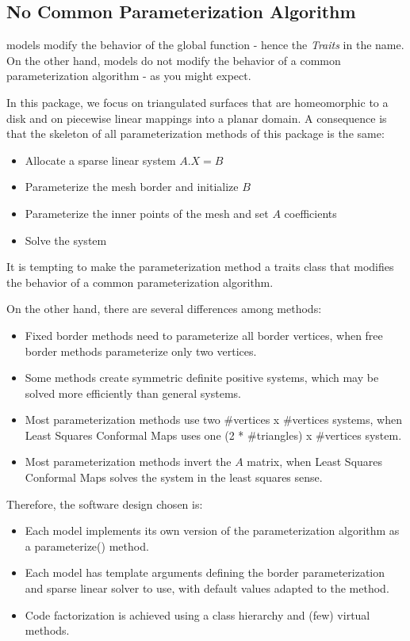 \subsection{No Common Parameterization Algorithm}

 models modify the behavior of the global function
 - hence the {\em Traits} in the name.
On the other hand,  models do not modify the behavior
of a common parameterization algorithm - as you might expect.

In this package, we focus on triangulated surfaces that are homeomorphic to a
disk and on piecewise linear mappings into a planar domain.
A consequence is that the skeleton of all parameterization methods of this
package is the same:
\begin{itemize}
\item Allocate a sparse linear system $A.X = B$
\item Parameterize the mesh border and initialize $B$
\item Parameterize the inner points of the mesh and set $A$ coefficients
\item Solve the system
\end{itemize}

It is tempting to make the parameterization method a traits class that
modifies the behavior of a common parameterization algorithm.

On the other hand, there are several differences among methods:
\begin{itemize}
\item Fixed border methods need to parameterize all border vertices,
      when free border methods parameterize only two vertices.
\item Some methods create symmetric definite positive systems,
      which may be solved more efficiently than general systems.
\item Most parameterization methods use two \#vertices x \#vertices systems,
      when Least Squares Conformal Maps uses one (2 * \#triangles) x \#vertices system.
\item Most parameterization methods invert the $A$ matrix,
      when Least Squares Conformal Maps solves the system in the least squares sense.
\end{itemize}

Therefore, the software design chosen is:
\begin{itemize}
\item Each  model implements its own version
      of the parameterization algorithm as a parameterize() method.
\item Each  model has template arguments
      defining the border parameterization and sparse linear solver to use,
      with default values adapted to the method.
\item Code factorization is achieved using a class hierarchy and (few) virtual methods.
\end{itemize}

